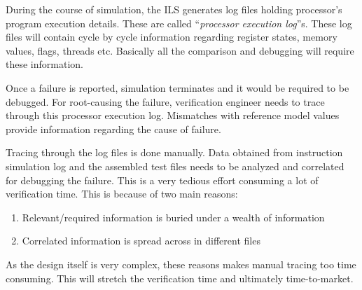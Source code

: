 \label{verif:exelog}
During the course of simulation, the ILS generates log files holding processor's program execution details. These are called ``\emph {processor execution log}''s. These log files will contain cycle by cycle information regarding register states, memory values, flags, threads etc. Basically all the comparison and debugging will require these information.

Once a failure is reported, simulation terminates and it would be required to be debugged. For root-causing the failure, verification engineer needs to trace through this processor execution log. Mismatches with reference model values provide information regarding the cause of failure.

Tracing through the log files is done manually. Data obtained from instruction simulation log and the assembled test files needs to be analyzed and correlated for debugging the failure. This is a very tedious effort consuming a lot of verification time. This is because of two main reasons:

\begin{enumerate}
	\item Relevant/required information is buried under a wealth of information
	\item Correlated information is spread across in different files
\end{enumerate}

As the design itself is very complex, these reasons makes manual tracing too time consuming. This will stretch the verification time and ultimately time-to-market.   


